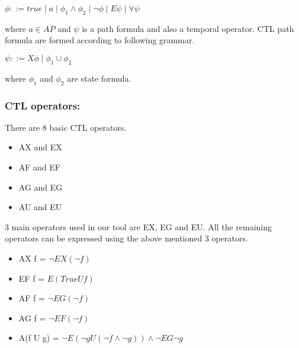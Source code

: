 \begin{center}
$\phi::=true\mid a\mid \phi_1\wedge\phi_2\mid\neg\phi\mid E \psi\mid\forall\psi$
\end{center}

where $a\in AP$ and $\psi$ is a path formula and also a temporal operator. CTL  path formula are formed according to following grammar.

\begin{center}
$\psi::=X\phi\mid\phi_1\cup\phi_2$
\end{center}

where $\phi_1$ and $\phi_2$ are state formula.

\subsubsection*{CTL operators:}
There are 8 basic CTL operators. 
\begin{itemize}
\item AX and EX
\item AF and EF
\item AG and EG
\item AU and EU
\end{itemize}

3 main operators used in our tool are EX, EG and EU. All the remaining operators can be expressed using the above mentioned 3 operators.

\begin{itemize}
\item AX f = $\neg E X(\neg f)$
\item EF f = $E (True U f)$
\item AF f = $\neg E G(\neg f)$
\item AG f = $\neg E F(\neg f)$
\item A(f U g) = $\neg E(\neg g U (\neg f \land \neg g)) \land \neg E G\neg g$
\end{itemize}

